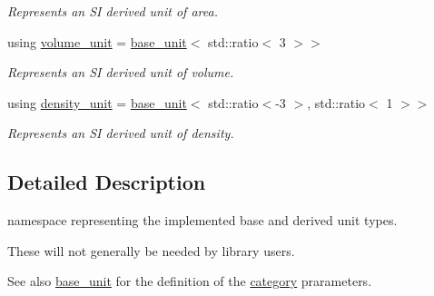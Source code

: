 \begin{DoxyCompactItemize}
\begin{DoxyCompactList}\small\item\em Represents an S\+I derived unit of area. \end{DoxyCompactList}\item 
\hypertarget{namespaceunits_1_1category_a69c6c6f05a27aa247360cbcf1455f7f2}{}using \hyperlink{namespaceunits_1_1category_a69c6c6f05a27aa247360cbcf1455f7f2}{volume\+\_\+unit} = \hyperlink{structunits_1_1base__unit}{base\+\_\+unit}$<$ std\+::ratio$<$ 3 $>$$>$\label{namespaceunits_1_1category_a69c6c6f05a27aa247360cbcf1455f7f2}

\begin{DoxyCompactList}\small\item\em Represents an S\+I derived unit of volume. \end{DoxyCompactList}\item 
\hypertarget{namespaceunits_1_1category_aa338785548e6227b8cf75db73e25e276}{}using \hyperlink{namespaceunits_1_1category_aa338785548e6227b8cf75db73e25e276}{density\+\_\+unit} = \hyperlink{structunits_1_1base__unit}{base\+\_\+unit}$<$ std\+::ratio$<$-\/3 $>$, std\+::ratio$<$ 1 $>$$>$\label{namespaceunits_1_1category_aa338785548e6227b8cf75db73e25e276}

\begin{DoxyCompactList}\small\item\em Represents an S\+I derived unit of density. \end{DoxyCompactList}\end{DoxyCompactItemize}


\subsection{Detailed Description}
namespace representing the implemented base and derived unit types. 

These will not generally be needed by library users. \begin{DoxySeeAlso}{See also}
\hyperlink{structunits_1_1base__unit}{base\+\_\+unit} for the definition of the \hyperlink{namespaceunits_1_1category}{category} prarameters. 
\end{DoxySeeAlso}
